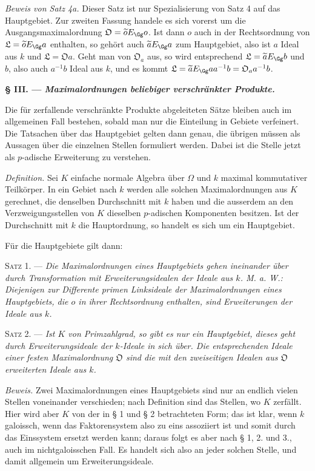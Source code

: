 \medskip
\noindent\emph{Beweis von Satz 4a.} Dieser Satz ist nur Spezialisierung von Satz 4 auf das Hauptgebiet. Zur zweiten Fassung handele es sich vorerst um die Ausgangsmaximalordnung $\mathfrak O=\widetilde oE_\Gg o$. Ist dann $o$ auch in der Rechtsordnung von $\mathfrak L=\widetilde oE_\Gg a$ enthalten, so gehört auch $\widetilde aE_\Gg a$ zum Hauptgebiet, also ist $a$ Ideal aus $k$ und $\mathfrak L=\mathfrak Oa$. Geht man von $\mathfrak O_a$ aus, so wird entsprechend $\mathfrak L=\widetilde aE_\Gg b$ und $b$, also auch $a^{-1}b$ Ideal aus $k$, und es kommt $\mathfrak L=\widetilde aE_\Gg aa^{-1}b=\mathfrak O_a a^{-1}b$.

\begin{center}
\textbf{§ III. --- \emph{Maximalordnungen beliebiger verschränkter Produkte.}}
\end{center}

Die für zerfallende verschränkte Produkte abgeleiteten Sätze bleiben auch im allgemeinen Fall bestehen, sobald man nur die Einteilung in Gebiete verfeinert. Die Tatsachen über das Hauptgebiet gelten dann genau, die übrigen müssen als Aussagen über die einzelnen Stellen formuliert werden. Dabei ist die Stelle jetzt als $p$-adische Erweiterung zu verstehen.

\emph{Definition.} Sei $K$ einfache normale Algebra über $\Omega$ und $k$ maximal kommutativer Teilkörper. In ein Gebiet nach $k$ werden alle solchen Maximalordnungen aus $K$ gerechnet, die denselben Durchschnitt mit $k$ haben und die ausserdem an den Verzweigungsstellen von $K$ dieselben $p$-adischen Komponenten besitzen. Ist der Durchschnitt mit $k$ die Hauptordnung, so handelt es sich um ein Hauptgebiet.

Für die Hauptgebiete gilt dann:

\medskip
\noindent\textsc{Satz 1. ---} \emph{Die Maximalordnungen eines Hauptgebiets gehen ineinander über durch Transformation mit Erweiterungsidealen der Ideale aus $k$. M. a. W.: Diejenigen zur Differente primen Linksideale der Maximalordnungen eines Hauptgebiets, die $o$ in ihrer Rechtsordnung enthalten, sind Erweiterungen der Ideale aus $k$.}

\medskip
\noindent\textsc{Satz 2. ---} \emph{Ist $K$ von Primzahlgrad, so gibt es nur ein Hauptgebiet, dieses geht durch Erweiterungsideale der $k$-Ideale in sich über. Die entsprechenden Ideale einer festen Maximalordnung $\mathfrak O$ sind die mit den zweiseitigen Idealen aus $\mathfrak O$ erweiterten Ideale aus $k$.}

\emph{Beweis.} Zwei Maximalordnungen eines Hauptgebiets sind nur an endlich vielen Stellen voneinander verschieden; nach Definition sind das Stellen, wo $K$ zerfällt. Hier wird aber $K$ von der in § 1 und § 2 betrachteten Form; das ist klar, wenn $k$ galoissch, wenn das Faktorensystem also zu eins assoziiert ist und somit durch das Einssystem ersetzt werden kann; daraus folgt es aber nach § 1, 2. und 3., auch im nichtgaloisschen Fall. Es handelt sich also an jeder solchen Stelle, und damit allgemein um Erweiterungsideale.

